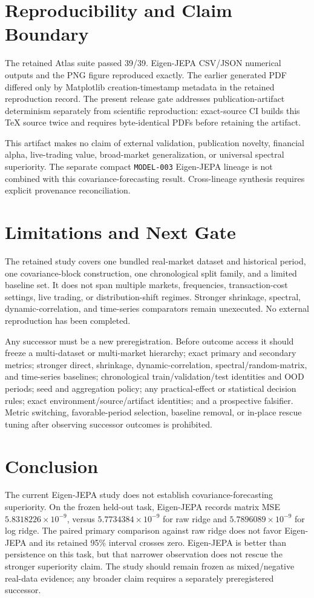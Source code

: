 \documentclass[10pt,conference]{IEEEtran}
\begin{document}
\section{Reproducibility and Claim Boundary}
The retained Atlas suite passed 39/39. Eigen-JEPA CSV/JSON numerical outputs and the PNG figure reproduced exactly. The earlier generated PDF differed only by Matplotlib creation-timestamp metadata in the retained reproduction record. The present release gate addresses publication-artifact determinism separately from scientific reproduction: exact-source CI builds this TeX source twice and requires byte-identical PDFs before retaining the artifact.

This artifact makes no claim of external validation, publication novelty, financial alpha, live-trading value, broad-market generalization, or universal spectral superiority. The separate compact \texttt{MODEL-003} Eigen-JEPA lineage is not combined with this covariance-forecasting result. Cross-lineage synthesis requires explicit provenance reconciliation.

\section{Limitations and Next Gate}
The retained study covers one bundled real-market dataset and historical period, one covariance-block construction, one chronological split family, and a limited baseline set. It does not span multiple markets, frequencies, transaction-cost settings, live trading, or distribution-shift regimes. Stronger shrinkage, spectral, dynamic-correlation, and time-series comparators remain unexecuted. No external reproduction has been completed.

Any successor must be a new preregistration. Before outcome access it should freeze a multi-dataset or multi-market hierarchy; exact primary and secondary metrics; stronger direct, shrinkage, dynamic-correlation, spectral/random-matrix, and time-series baselines; chronological train/validation/test identities and OOD periods; seed and aggregation policy; any practical-effect or statistical decision rules; exact environment/source/artifact identities; and a prospective falsifier. Metric switching, favorable-period selection, baseline removal, or in-place rescue tuning after observing successor outcomes is prohibited.

\section{Conclusion}
The current Eigen-JEPA study does not establish covariance-forecasting superiority. On the frozen held-out task, Eigen-JEPA records matrix MSE $5.8318226\times10^{-9}$, versus $5.7734384\times10^{-9}$ for raw ridge and $5.7896089\times10^{-9}$ for log ridge. The paired primary comparison against raw ridge does not favor Eigen-JEPA and its retained 95\% interval crosses zero. Eigen-JEPA is better than persistence on this task, but that narrower observation does not rescue the stronger superiority claim. The study should remain frozen as mixed/negative real-data evidence; any broader claim requires a separately preregistered successor.
\end{document}

